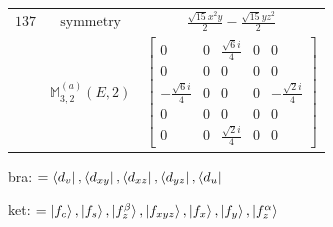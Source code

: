\documentclass[fleqn,8pt,landscape]{jsarticle}
\begin{document}
\begin{longtable}{ccc}
$ 137 $ & $ \text{symmetry} $ & $ \frac{\sqrt{15} x^{2} y}{2} - \frac{\sqrt{15} y z^{2}}{2} $ \\
$  $ & $ \mathbb{M}_{3,2}^{(a)}(E,2) $ & $ \begin{bmatrix} 0 & 0 & \frac{\sqrt{6} i}{4} & 0 & 0 \\ 0 & 0 & 0 & 0 & 0 \\ - \frac{\sqrt{6} i}{4} & 0 & 0 & 0 & - \frac{\sqrt{2} i}{4} \\ 0 & 0 & 0 & 0 & 0 \\ 0 & 0 & \frac{\sqrt{2} i}{4} & 0 & 0 \end{bmatrix} $ \\ \hline
\end{longtable}
bra: $=\bra{d_{v}}, \bra{d_{xy}}, \bra{d_{xz}}, \bra{d_{yz}}, \bra{d_{u}}$

\noindent
ket: $=\ket{f_{c}}, \ket{f_{s}}, \ket{f_{z}^{\beta}}, \ket{f_{xyz}}, \ket{f_{x}}, \ket{f_{y}}, \ket{f_{z}^{\alpha}}$
\renewcommand{\arraystretch}{1.6}
\end{document}
